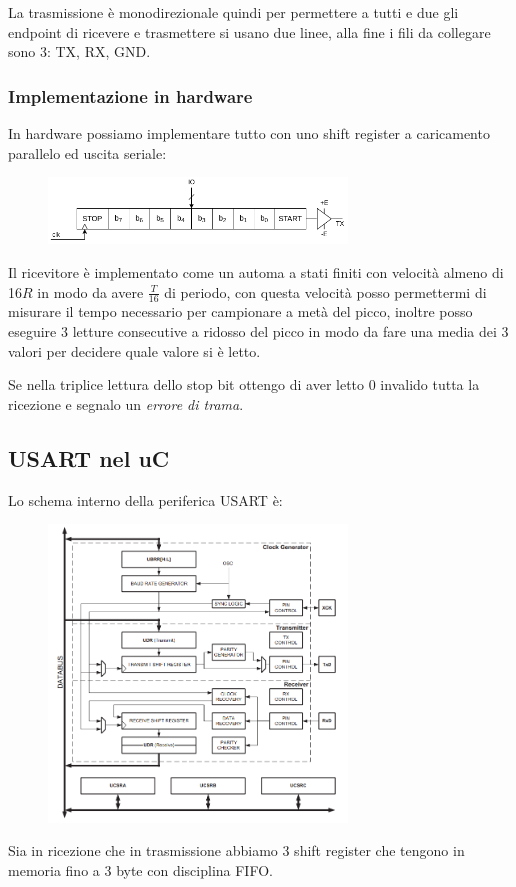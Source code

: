 La trasmissione è monodirezionale quindi per permettere a tutti e due gli endpoint di ricevere e trasmettere si usano due linee, alla fine i fili da collegare sono 3: TX, RX, GND.

\subsubsection{Implementazione in hardware}
In hardware possiamo implementare tutto con uno shift register a caricamento parallelo ed uscita seriale:
\begin{figure}[H]
    \centering
    \includegraphics[width=300px]{images/22_USART/shift_register.png}
\end{figure}

Il ricevitore è implementato come un automa a stati finiti con velocità almeno di 16$R$ in modo da avere $\frac{T}{16}$ di periodo, con questa velocità posso permettermi di misurare il tempo necessario per campionare a metà del picco, inoltre posso eseguire 3 letture consecutive a ridosso del picco in modo da fare una media dei 3 valori per decidere quale valore si è letto.

Se nella triplice lettura dello stop bit ottengo di aver letto 0 invalido tutta la ricezione e segnalo un \emph{errore di trama}.

\subsection{USART nel uC}
Lo schema interno della periferica USART è:
\begin{figure}[H]
    \centering
    \includegraphics[width=300px]{images/22_USART/USART.png}
\end{figure}
Sia in ricezione che in trasmissione abbiamo 3 shift register che tengono in memoria fino a 3 byte con disciplina FIFO.

